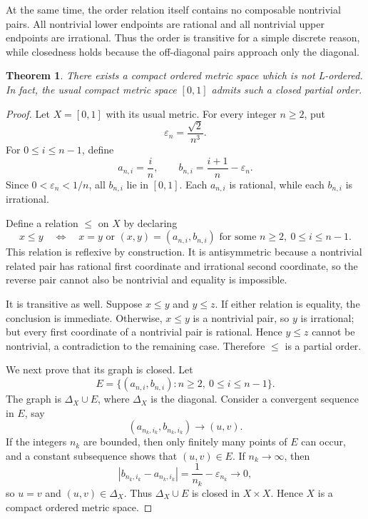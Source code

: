 \documentclass[11pt]{article}
\newtheorem{theorem}{Theorem}
\newcommand{\eps}{\varepsilon}
\begin{document}
At the same time, the order relation itself contains no composable nontrivial
pairs.  All nontrivial lower endpoints are rational and all nontrivial upper
endpoints are irrational.  Thus the order is transitive for a simple discrete
reason, while closedness holds because the off-diagonal pairs approach only
the diagonal.

\begin{theorem}
There exists a compact ordered metric space which is not L-ordered.  In fact,
the usual compact metric space $[0,1]$ admits such a closed partial order.
\end{theorem}

\begin{proof}
Let $X=[0,1]$ with its usual metric.  For every integer $n\ge2$, put
\[
  \eps_n=\frac{\sqrt2}{n^3}.
\]
For $0\le i\le n-1$, define
\[
  a_{n,i}=\frac{i}{n},
  \qquad
  b_{n,i}=\frac{i+1}{n}-\eps_n .
\]
Since $0<\eps_n<1/n$, all $b_{n,i}$ lie in $[0,1]$.  Each $a_{n,i}$ is
rational, while each $b_{n,i}$ is irrational.

Define a relation $\le$ on $X$ by declaring
\[
  x\le y
  \quad\Longleftrightarrow\quad
  x=y
  \text{ or }
  (x,y)=(a_{n,i},b_{n,i})
  \text{ for some } n\ge2,\ 0\le i\le n-1 .
\]
This relation is reflexive by construction.  It is antisymmetric because a
nontrivial related pair has rational first coordinate and irrational second
coordinate, so the reverse pair cannot also be nontrivial and equality is
impossible.

It is transitive as well.  Suppose $x\le y$ and $y\le z$.  If either relation
is equality, the conclusion is immediate.  Otherwise, $x\le y$ is a
nontrivial pair, so $y$ is irrational; but every first coordinate of a
nontrivial pair is rational.  Hence $y\le z$ cannot be nontrivial, a
contradiction to the remaining case.  Therefore $\le$ is a partial order.

We next prove that its graph is closed.  Let
\[
  E=\{(a_{n,i},b_{n,i}): n\ge2,\ 0\le i\le n-1\}.
\]
The graph is $\Delta_X\cup E$, where $\Delta_X$ is the diagonal.  Consider a
convergent sequence in $E$, say
\[
  (a_{n_k,i_k},b_{n_k,i_k})\to (u,v).
\]
If the integers $n_k$ are bounded, then only finitely many points of $E$ can
occur, and a constant subsequence shows that $(u,v)\in E$.  If
$n_k\to\infty$, then
\[
  |b_{n_k,i_k}-a_{n_k,i_k}|
  =\frac1{n_k}-\eps_{n_k}\longrightarrow 0,
\]
so $u=v$ and $(u,v)\in\Delta_X$.  Thus $\Delta_X\cup E$ is closed in
$X\times X$.  Hence $X$ is a compact ordered metric space.


\end{proof}
\end{document}
